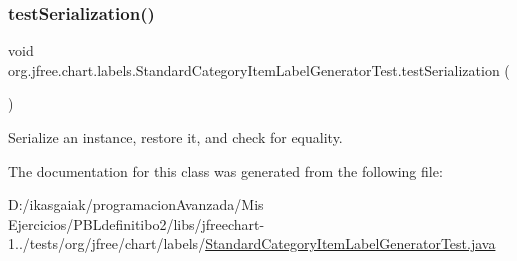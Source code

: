 \subsubsection{\texorpdfstring{test\+Serialization()}{testSerialization()}}
{\footnotesize\ttfamily void org.\+jfree.\+chart.\+labels.\+Standard\+Category\+Item\+Label\+Generator\+Test.\+test\+Serialization (\begin{DoxyParamCaption}{ }\end{DoxyParamCaption})}

Serialize an instance, restore it, and check for equality. 

The documentation for this class was generated from the following file\+:\begin{DoxyCompactItemize}
\item 
D\+:/ikasgaiak/programacion\+Avanzada/\+Mis Ejercicios/\+P\+B\+Ldefinitibo2/libs/jfreechart-\/1../tests/org/jfree/chart/labels/\mbox{\hyperlink{_standard_category_item_label_generator_test_8java}{Standard\+Category\+Item\+Label\+Generator\+Test.\+java}}\end{DoxyCompactItemize}
